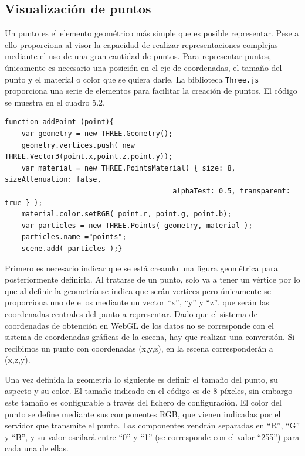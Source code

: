 \subsection{Visualización de puntos}
Un punto es el elemento geométrico más simple que es posible representar. Pese a ello proporciona al visor la capacidad de realizar representaciones complejas mediante el uso de una gran cantidad de puntos. Para representar puntos, únicamente es necesario una posición en el eje de coordenadas, el tamaño del punto y el material o color que se quiera darle. 
La biblioteca \texttt{Three.js} proporciona una serie de elementos para facilitar la creación de puntos. El código se muestra en el cuadro 5.2.


\begin{lstlisting}[caption= Creación y visualización de puntos, label=cod.crearpunto]
function addPoint (point){
	var geometry = new THREE.Geometry();
	geometry.vertices.push( new THREE.Vector3(point.x,point.z,point.y));
	var material = new THREE.PointsMaterial( { size: 8, sizeAttenuation: false, 
										alphaTest: 0.5, transparent: true } );
	material.color.setRGB( point.r, point.g, point.b);
	var particles = new THREE.Points( geometry, material );
	particles.name ="points";
	scene.add( particles );}
\end{lstlisting}

Primero es necesario indicar que se está creando una figura geométrica para posteriormente definirla. Al tratarse de un punto, solo va a tener un vértice por lo que al definir la geometría se indica que serán vertices pero únicamente se proporciona uno de ellos mediante un vector ``x'', ``y'' y  ``z'', que serán las coordenadas centrales del punto a representar. Dado que el sistema de coordenadas de obtención en WebGL de los datos no se corresponde con el sistema de coordenadas gráficas de la escena, hay que realizar una conversión. Si recibimos un punto con coordenadas (x,y,z), en la escena corresponderán a (x,z,y). 


Una vez definida la geometría lo siguiente es definir el tamaño del punto, su aspecto y su color. El tamaño indicado en el código es de 8 píxeles, sin embargo este tamaño es configurable a través del fichero de configuración. El color del punto se define mediante sus componentes RGB, que vienen indicadas por el servidor que transmite el punto. Las componentes vendrán separadas en ``R'', ``G'' y ``B'', y su valor oscilará entre ``0'' y ``1'' (se corresponde con el valor ``255'') para cada una de ellas.

